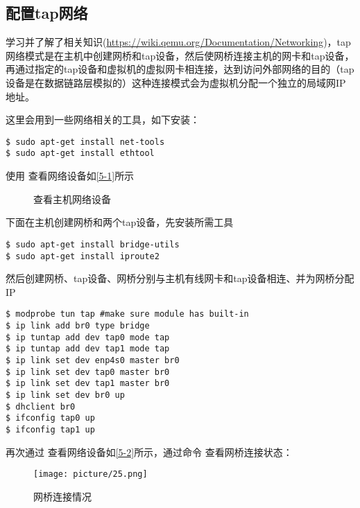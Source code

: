 \documentclass[UTF8,12pt]{ctexart}
\numberwithin{equation}{section}
\begin{document}
\subsection{配置tap网络}
学习并了解了相关知识(\url{https://wiki.qemu.org/Documentation/Networking})，tap 网络模式是在主机中创建网桥和tap设备，然后使网桥连接主机的网卡和tap设备，再通过指定的tap设备和虚拟机的虚拟网卡相连接，达到访问外部网络的目的（tap设备是在数据链路层模拟的）这种连接模式会为虚拟机分配一个独立的局域网IP地址。

这里会用到一些网络相关的工具，如下安装：
\begin{lstlisting}
$ sudo apt-get install net-tools
$ sudo apt-get install ethtool
\end{lstlisting}
使用 \textbf{\color[RGB]{100,100,235}{ifconig}} 查看网络设备如\autoref{5-1}所示
\begin{figure}[H]
    \centering
    \label{ifconfig}
    \caption{查看主机网络设备}
\end{figure}
下面在主机创建网桥和两个tap设备，先安装所需工具
\begin{lstlisting}
$ sudo apt-get install bridge-utils
$ sudo apt-get install iproute2
\end{lstlisting}
然后创建网桥、tap设备、网桥分别与主机有线网卡和tap设备相连、并为网桥分配 IP
\begin{lstlisting}
$ modprobe tun tap #make sure module has built-in
$ ip link add br0 type bridge
$ ip tuntap add dev tap0 mode tap
$ ip tuntap add dev tap1 mode tap
$ ip link set dev enp4s0 master br0
$ ip link set dev tap0 master br0
$ ip link set dev tap1 master br0
$ ip link set dev br0 up
$ dhclient br0
$ ifconfig tap0 up
$ ifconfig tap1 up
\end{lstlisting}
再次通过 \textbf{\color[RGB]{100,100,235}{ifconfig}} 查看网络设备如\autoref{5-2}所示，通过命令 \textbf{\color[RGB]{100,100,235}{brctl show}} 查看网桥连接状态：
\begin{figure}[H]
    \centering
    \texttt{[image: picture/25.png]}
    \label{fig6}
    \caption{网桥连接情况}
\end{figure}
\end{document}
